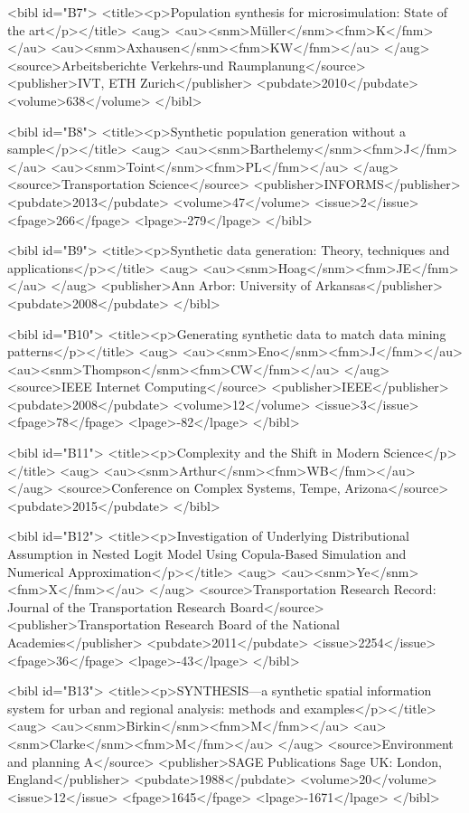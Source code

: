 \documentclass{bmcart}
\begin{document}
\begin{backmatter}
{<bibl id="B7">
  <title><p>Population synthesis for microsimulation: State of the
  art</p></title>
  <aug>
    <au><snm>M{\"u}ller</snm><fnm>K</fnm></au>
    <au><snm>Axhausen</snm><fnm>KW</fnm></au>
  </aug>
  <source>Arbeitsberichte Verkehrs-und Raumplanung</source>
  <publisher>IVT, ETH Zurich</publisher>
  <pubdate>2010</pubdate>
  <volume>638</volume>
</bibl>

<bibl id="B8">
  <title><p>Synthetic population generation without a sample</p></title>
  <aug>
    <au><snm>Barthelemy</snm><fnm>J</fnm></au>
    <au><snm>Toint</snm><fnm>PL</fnm></au>
  </aug>
  <source>Transportation Science</source>
  <publisher>INFORMS</publisher>
  <pubdate>2013</pubdate>
  <volume>47</volume>
  <issue>2</issue>
  <fpage>266</fpage>
  <lpage>-279</lpage>
</bibl>

<bibl id="B9">
  <title><p>Synthetic data generation: Theory, techniques and
  applications</p></title>
  <aug>
    <au><snm>Hoag</snm><fnm>JE</fnm></au>
  </aug>
  <publisher>Ann Arbor: University of Arkansas</publisher>
  <pubdate>2008</pubdate>
</bibl>

<bibl id="B10">
  <title><p>Generating synthetic data to match data mining patterns</p></title>
  <aug>
    <au><snm>Eno</snm><fnm>J</fnm></au>
    <au><snm>Thompson</snm><fnm>CW</fnm></au>
  </aug>
  <source>IEEE Internet Computing</source>
  <publisher>IEEE</publisher>
  <pubdate>2008</pubdate>
  <volume>12</volume>
  <issue>3</issue>
  <fpage>78</fpage>
  <lpage>-82</lpage>
</bibl>

<bibl id="B11">
  <title><p>Complexity and the Shift in Modern Science</p></title>
  <aug>
    <au><snm>Arthur</snm><fnm>WB</fnm></au>
  </aug>
  <source>Conference on Complex Systems, Tempe, Arizona</source>
  <pubdate>2015</pubdate>
</bibl>

<bibl id="B12">
  <title><p>Investigation of Underlying Distributional Assumption in Nested
  Logit Model Using Copula-Based Simulation and Numerical
  Approximation</p></title>
  <aug>
    <au><snm>Ye</snm><fnm>X</fnm></au>
  </aug>
  <source>Transportation Research Record: Journal of the Transportation
  Research Board</source>
  <publisher>Transportation Research Board of the National
  Academies</publisher>
  <pubdate>2011</pubdate>
  <issue>2254</issue>
  <fpage>36</fpage>
  <lpage>-43</lpage>
</bibl>

<bibl id="B13">
  <title><p>SYNTHESIS—a synthetic spatial information system for urban and
  regional analysis: methods and examples</p></title>
  <aug>
    <au><snm>Birkin</snm><fnm>M</fnm></au>
    <au><snm>Clarke</snm><fnm>M</fnm></au>
  </aug>
  <source>Environment and planning A</source>
  <publisher>SAGE Publications Sage UK: London, England</publisher>
  <pubdate>1988</pubdate>
  <volume>20</volume>
  <issue>12</issue>
  <fpage>1645</fpage>
  <lpage>-1671</lpage>
</bibl>

}
\end{backmatter}
\end{document}
